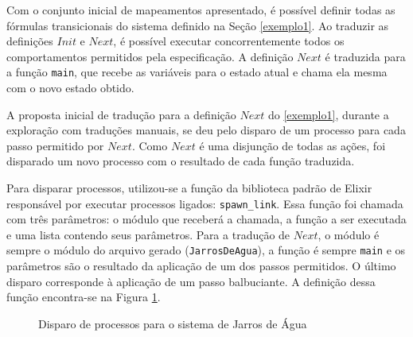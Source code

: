 Com o conjunto inicial de mapeamentos apresentado, é possível definir todas as
fórmulas transicionais do sistema definido na Seção \ref{exemplo1}. Ao traduzir
as definições $Init$ e $Next$, é possível executar concorrentemente todos os
comportamentos permitidos pela especificação. A definição $Next$ é traduzida
para a função \texttt{main}, que recebe as variáveis para o estado atual e chama
ela mesma com o novo estado obtido.

A proposta inicial de tradução para a definição $Next$ do \ref{exemplo1},
durante a exploração com traduções manuais, se deu
pelo disparo de um processo para cada passo permitido por $Next$. Como $Next$ é uma disjunção de todas as ações, foi disparado um novo processo com o resultado de cada função traduzida.

Para disparar processos, utilizou-se a função da biblioteca padrão de Elixir responsável por executar processos ligados: \texttt{spawn\_link}. Essa função foi chamada com três parâmetros: o módulo que receberá a chamada, a função a ser executada e uma lista contendo seus parâmetros. Para a tradução de $Next$, o módulo é sempre o módulo do arquivo gerado (\texttt{JarrosDeAgua}), a função é sempre \texttt{main} e os parâmetros são o resultado da aplicação de um dos passos permitidos. O último disparo corresponde à aplicação de um passo balbuciante. A definição dessa função encontra-se na Figura \ref{fig:main-ex1}.

\begin{figure}[h]
  \centering
  \caption{Disparo de processos para o sistema de Jarros de Água}
\label{fig:main-ex1}
\end{figure}

